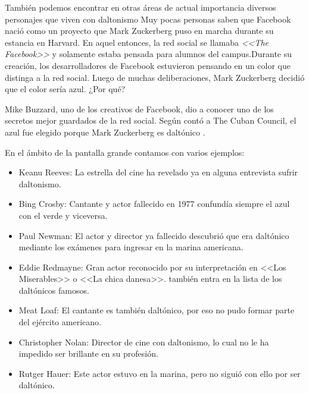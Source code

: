 \documentclass[10pt]{article}
\begin{document}
\setlength{\parskip}{2mm}

También podemos encontrar en otras áreas de actual importancia diversos personajes que viven con daltonismo 
Muy pocas personas saben que Facebook nació como un proyecto que Mark Zuckerberg puso en marcha durante su estancia en Harvard. En aquel entonces, la red social se llamaba \textit{ <<The Facebook>>} y solamente estaba pensada para alumnos del campus.Durante su creación, los desarrolladores de Facebook estuvieron pensando en un color que distinga a la red social. Luego de muchas deliberaciones, Mark Zuckerberg decidió que el color sería azul. ¿Por qué?

\setlength{\parskip}{2mm}

Mike Buzzard, uno de los creativos de Facebook, dio a conocer uno de los secretos mejor guardados de la red social. Según contó a The Cuban Council, el azul fue elegido porque Mark Zuckerberg es daltónico \cite{IEEEreferencias:Ref8}.

\setlength{\parskip}{2mm}

En el ámbito de la pantalla grande contamos con varios ejemplos: 

\setlength{\parskip}{2mm}
\begin{itemize}
    \item Keanu Reeves: La estrella del cine ha revelado ya en alguna entrevista sufrir daltonismo\cite{IEEEreferencias:Ref9}.
    \item Bing Crosby: Cantante y actor fallecido en 1977 confundía siempre el azul con el verde y viceversa\cite{IEEEreferencias:Ref9}.
    \item Paul Newman: El actor y director ya fallecido descubrió que era daltónico mediante los exámenes para ingresar en la marina americana\cite{IEEEreferencias:Ref9}.
    \item Eddie Redmayne: Gran actor reconocido por su interpretación en <<Los Miserables>> o <<La chica danesa>>. también entra en la lista de los daltónicos famosos\cite{IEEEreferencias:Ref9}.
    \item Meat Loaf: El cantante es también daltónico, por eso no pudo formar parte del ejército americano\cite{IEEEreferencias:Ref9}.
    \item Christopher Nolan: Director de cine con daltonismo, lo cual no le ha impedido ser brillante en su profesión\cite{IEEEreferencias:Ref9}.
    \item Rutger Hauer: Este actor estuvo en la marina, pero no siguió con ello por ser daltónico\cite{IEEEreferencias:Ref9}.
\end{itemize}
\end{document}
